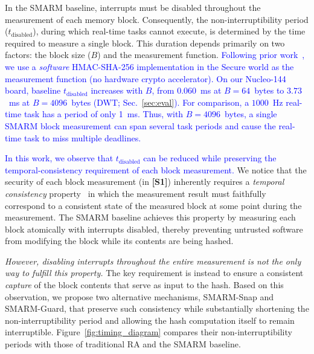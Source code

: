 \documentclass[conference]{IEEEtran}
\newcommand{\tdis}{$t_{\mathrm{disabled}}$\xspace}
\newcommand{\smarmcopy}{SMARM-Snap\xspace}
\newcommand{\smarmlock}{SMARM-Guard\xspace}
\newcommand\ben[1]{\textcolor{blue}{#1}}
\begin{document}
In the SMARM baseline, interrupts must be disabled throughout the measurement of each memory block. Consequently, the non-interruptibility period (\tdis), during which real-time tasks cannot execute, is determined by the time required to measure a single block. This duration depends primarily on two factors: the block size ($B$) and the measurement function.
%
\ben{Following prior work~\cite{smarmplus2026,carpent2018smarm}, we use a \emph{software} HMAC-SHA-256 implementation in the Secure world as the measurement function (no hardware crypto accelerator). On our Nucleo-144 board, baseline \tdis{} increases with $B$, from $0.060$~ms at $B{=}64$~bytes to $3.73$~ms at $B{=}4096$~bytes (DWT; Sec.~\ref{sec:eval}). For comparison, a $1000$~Hz real-time task has a period of only 1~ms. Thus, with $B{=}4096$~bytes, a single SMARM block measurement can span several task periods and cause the real-time task to miss multiple deadlines.}

\ben{In this work, we observe that \tdis{} can be reduced while preserving the temporal-consistency requirement of each block measurement.}
We notice that the security of each block measurement (in \textbf{[S1]}) inherently requires a \emph{temporal consistency} property~\cite{carpent2018temporal} in which the measurement result must faithfully correspond to a consistent state of the measured block at some point during the measurement.
The SMARM baseline achieves this property by measuring each block atomically with interrupts disabled, thereby preventing untrusted software from modifying the block while its contents are being hashed.

\emph{However, disabling interrupts throughout the entire measurement is not the only way to fulfill this property.}
The key requirement is instead to ensure a consistent \emph{capture} of the block contents that serve as input to the hash. Based on this observation, we propose two alternative mechanisms, \smarmcopy and \smarmlock, that preserve such consistency while substantially shortening the non-interruptibility period and allowing the hash computation itself to remain interruptible. Figure~\ref{fig:timing_diagram} compares their non-interruptibility periods with those of traditional RA and the SMARM baseline.
\end{document}
